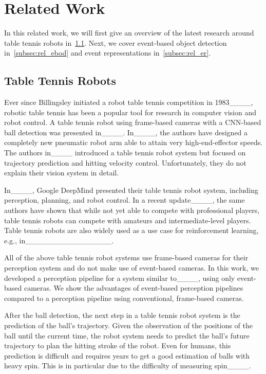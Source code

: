 \section{Related Work}
In this related work, we will first give an overview of the latest research around table tennis robots in~\cref{subsec:rl_ttr}.
%
Next, we cover event-based object detection in~\cref{subsec:rel_ebod} and event representations in~\cref{subsec:rel_er}.

\subsection{Table Tennis Robots}\label{subsec:rl_ttr}

Ever since Billingsley initiated a robot table tennis competition in 1983____, robotic table tennis has been a popular tool for research in computer vision and robot control.
%
A table tennis robot using frame-based cameras with a \ac{CNN}-based ball detection was presented in____.
In____, the authors have designed a completely new pneumatic robot arm able to attain very high-end-effector speeds.
%
The authors in____ introduced a table tennis robot system but focused on trajectory prediction and hitting velocity control.
%
Unfortunately, they do not explain their vision system in detail.

In____, Google DeepMind presented their table tennis robot system, including perception, planning, and robot control.
%
In a recent update____, the same authors have shown that while not yet able to compete with professional players, table tennis robots can compete with amateurs and intermediate-level players.
%
Table tennis robots are also widely used as a use case for reinforcement learning, e.g., in________________.

All of the above table tennis robot systems use frame-based cameras for their perception system and do not make use of event-based cameras.
%
In this work, we developed a perception pipeline for a system similar to____, using only event-based cameras.
%
We show the advantages of event-based perception pipelines compared to a perception pipeline using conventional, frame-based cameras.

After the ball detection, the next step in a table tennis robot system is the prediction of the ball's trajectory.
%
Given the observation of the positions of the ball until the current time, the robot system needs to predict the ball's future trajectory to plan the hitting stroke of the robot.
%
Even for humans, this prediction is difficult and requires years to get a good estimation of balls with heavy spin.
%
This is in particular due to the difficulty of measuring spin____.

